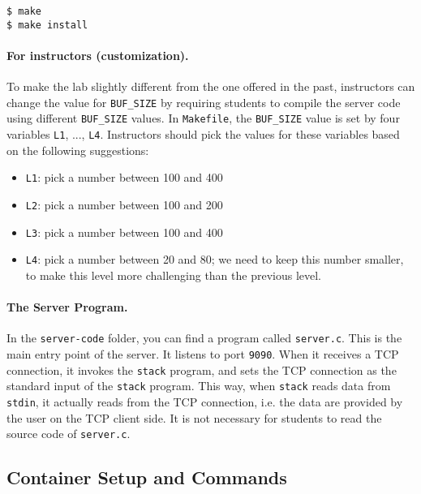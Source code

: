 \begin{lstlisting}
$ make
$ make install
\end{lstlisting}
 

\paragraph{For instructors (customization).}
To make the lab slightly different from the one offered in the past,
instructors can change the value for \texttt{BUF\_SIZE} by requiring
students to compile the server code using different \texttt{BUF\_SIZE} values.
In \texttt{Makefile}, the \texttt{BUF\_SIZE} value is set by
four variables \texttt{L1}, ..., \texttt{L4}.
Instructors should pick the values for these variables based
on the following suggestions:

\begin{itemize}[noitemsep]
\item \texttt{L1}: pick a number between 100 and 400
\item \texttt{L2}: pick a number between 100 and 200
\item \texttt{L3}: pick a number between 100 and 400
\item \texttt{L4}: pick a number between 20 and 80;
we need to keep this number smaller, to make this level more challenging 
than the previous level. 
\end{itemize}



\paragraph{The Server Program.} 
In the \texttt{server-code} folder, you can find a program called \texttt{server.c}. 
This is the main entry point of the server. It listens to port \texttt{9090}. 
When it receives a TCP connection, it 
invokes the \texttt{stack} program, and sets the TCP connection
as the standard input of the \texttt{stack} program. This way,
when \texttt{stack} reads data from \texttt{stdin}, it actually 
reads from the TCP connection, i.e. the data are provided by
the user on the TCP client side. It is not necessary for 
students to read the source code of \texttt{server.c}.  


\subsection{Container Setup and Commands}

